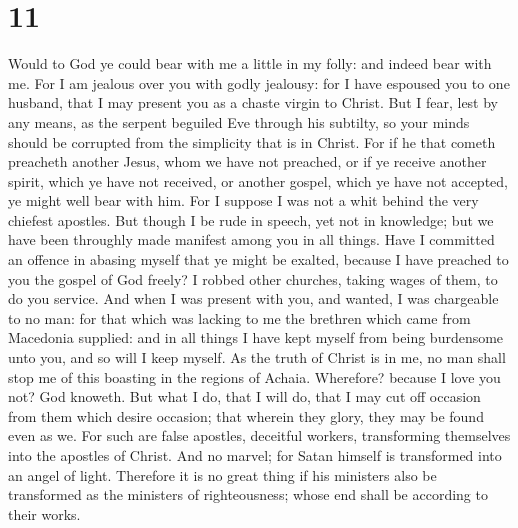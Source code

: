 \hypertarget{section-10}{%
\section{11}\label{section-10}}

 Would to God ye could bear with me a little in my folly:
and indeed bear with me.  For I am jealous over you with
godly jealousy: for I have espoused you to one husband, that I may
present you as a chaste virgin to Christ.  But I fear, lest
by any means, as the serpent beguiled Eve through his subtilty, so your
minds should be corrupted from the simplicity that is in Christ.
 For if he that cometh preacheth another Jesus, whom we have
not preached, or if ye receive another spirit, which ye have not
received, or another gospel, which ye have not accepted, ye might well
bear with him.  For I suppose I was not a whit behind the
very chiefest apostles.  But though I be rude in speech, yet
not in knowledge; but we have been throughly made manifest among you in
all things.  Have I committed an offence in abasing myself
that ye might be exalted, because I have preached to you the gospel of
God freely?  I robbed other churches, taking wages of them,
to do you service.  And when I was present with you, and
wanted, I was chargeable to no man: for that which was lacking to me the
brethren which came from Macedonia supplied: and in all things I have
kept myself from being burdensome unto you, and so will I keep myself.
 As the truth of Christ is in me, no man shall stop me of
this boasting in the regions of Achaia.  Wherefore? because
I love you not? God knoweth.  But what I do, that I will
do, that I may cut off occasion from them which desire occasion; that
wherein they glory, they may be found even as we.  For such
are false apostles, deceitful workers, transforming themselves into the
apostles of Christ.  And no marvel; for Satan himself is
transformed into an angel of light.  Therefore it is no
great thing if his ministers also be transformed as the ministers of
righteousness; whose end shall be according to their works.

